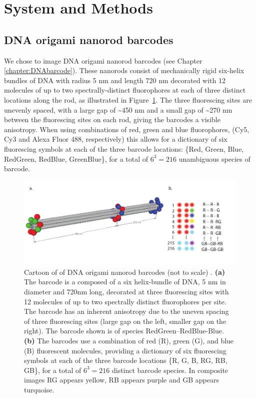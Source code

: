\section{System and Methods}

\subsection{DNA origami nanorod barcodes}
We chose to image DNA origami nanorod barcodes (see Chapter \ref{chapter:DNAbarcode}). These nanorods consist of mechanically rigid six-helix bundles of DNA with radius 5 nm and length 720 nm decorated with  12 molecules of up to two spectrally-distinct fluorophores at each of three distinct locations along the rod, as illustrated in Figure~\ref{fig:cartoonBarcode}. The three fluorescing sites are unevenly spaced, with a large gap of \textasciitilde 450 nm and a small gap of \textasciitilde 270 nm  between the fluorescing sites on each rod, giving the barcodes a visible anisotropy. When using combinations of red, green and blue fluorophores, (Cy5, Cy3 and Alexa Fluor 488, respectively) this allows for a dictionary of six fluorescing symbols at each of the three barcode locations: \{Red, Green, Blue, RedGreen, RedBlue, GreenBlue\}, for a total of $6^{3}=216$  unambiguous species of barcode.

\begin{figure}[htbp]
\begin{center}
	\includegraphics[width=\textwidth]{figures/theoryCartoonBarcode}
	\caption{Cartoon of of DNA origami nanorod barcodes (not to scale) . \textbf{(a)} The barcode is a composed of a six  helix-bundle of DNA, 5 nm in diameter and 720nm long, decorated at three fluorescing sites with 12 molecules of up to two  spectrally distinct fluorophores per site. The barcode has an inherent anisotropy due to the uneven spacing of three fluorescing sites (large gap on the left, smaller gap on the right). The barcode shown is of species RedGreen--RedBlue-Blue. \textbf{(b)} The barcodes use a combination of red (R), green (G), and blue (B) fluorescent molecules, providing a dictionary of six fluorescing symbols at each of the three barcode locations \{R, G, B, RG, RB, GB\}, for a total of $6^{3}=216$ distinct barcode species. In composite images RG appears yellow, RB appears purple and GB appears turquoise.   \label{fig:cartoonBarcode}}
\end{center}	
\end{figure}

